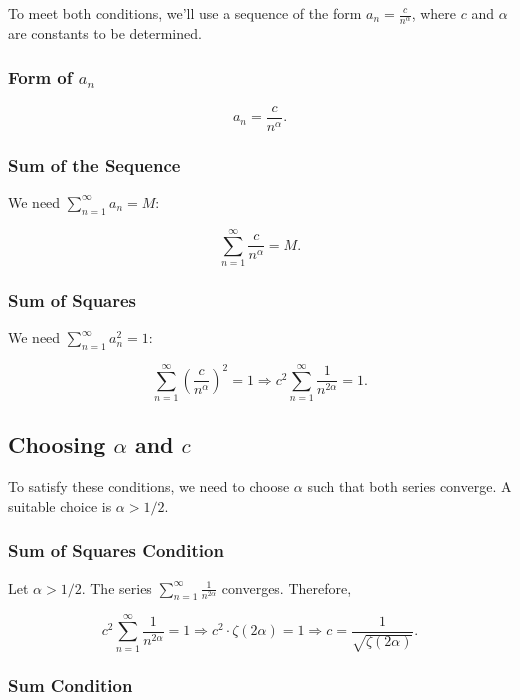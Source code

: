 \documentclass[a4 paper]{article}
\theoremstyle{boldStyle}
\theoremstyle{boldBlueStyle}
\theoremstyle{boldPurpleStyle}
\theoremstyle{boldRedStyle}
\begin{document}
\begin{enumerate}
To meet both conditions, we'll use a sequence of the form \(a_n = \frac{c}{n^\alpha}\), where \(c\) and \(\alpha\) are constants to be determined.

\subsubsection*{Form of \(a_n\)}

\[
a_n = \frac{c}{n^\alpha}.
\]

\subsubsection*{Sum of the Sequence}

We need \(\sum_{n=1}^{\infty} a_n = M\):

\[
\sum_{n=1}^{\infty} \frac{c}{n^\alpha} = M.
\]

\subsubsection*{Sum of Squares}

We need \(\sum_{n=1}^{\infty} a_n^2 = 1\):

\[
\sum_{n=1}^{\infty} \left(\frac{c}{n^\alpha}\right)^2 = 1 \Rightarrow c^2 \sum_{n=1}^{\infty} \frac{1}{n^{2\alpha}} = 1.
\]

\subsection*{Choosing \(\alpha\) and \(c\)}

To satisfy these conditions, we need to choose \(\alpha\) such that both series converge. A suitable choice is \(\alpha > 1/2\).

\subsubsection*{Sum of Squares Condition}

Let \(\alpha > 1/2\). The series \(\sum_{n=1}^{\infty} \frac{1}{n^{2\alpha}}\) converges. Therefore,

\[
c^2 \sum_{n=1}^{\infty} \frac{1}{n^{2\alpha}} = 1 \Rightarrow c^2 \cdot \zeta(2\alpha) = 1 \Rightarrow c = \frac{1}{\sqrt{\zeta(2\alpha)}}.
\]

\subsubsection*{Sum Condition}


\end{enumerate}
\end{document}

